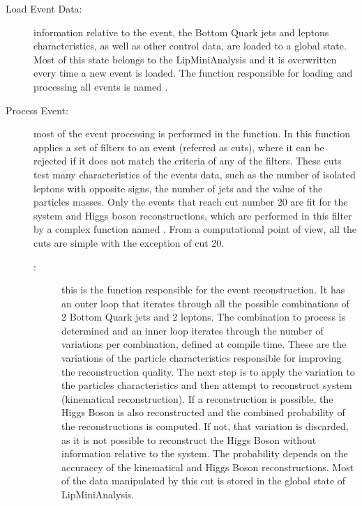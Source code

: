 \begin{description}
	\item[Load Event Data:] information relative to the event, the Bottom Quark jets and leptons characteristics, as well as other control data, are loaded to a global state. Most of this state belongs to the LipMiniAnalysis and it is overwritten every time a new event is loaded. The function responsible for loading and processing all events is named \ttLoop.
	\item[Process Event:] most of the event processing is performed in the \ttDoCuts function. In this function applies a set of filters to an event (referred as cuts), where it can be rejected if it does not match the criteria of any of the filters. These cuts test many characteristics of the events data, such as the number of isolated leptons with opposite signs, the number of jets and the value of the particles masses. Only the events that reach cut number 20 are fit for the \ttbar system and Higgs boson reconstructions, which are performed in this filter by a complex function named \ttDilepKinFit. From a computational point of view, all the cuts are simple with the exception of cut 20.
	\begin{description}
		\item[\ttDilepKinFit:] this is the function responsible for the event reconstruction. It has an outer loop that iterates through all the possible combinations of 2 Bottom Quark jets and 2 leptons. The combination to process is determined and an inner loop iterates through the number of variations per combination, defined at compile time. These are the variations of the particle characteristics responsible for improving the reconstruction quality. The next step is to apply the variation to the particles characteristics and then attempt to reconstruct \ttbar system (kinematical reconstruction). If a reconstruction is possible, the Higgs Boson is also reconstructed and the combined probability of the reconstructions is computed. If not, that variation is discarded, as it is not possible to reconstruct the Higgs Boson without information relative to the \ttbar system. The probability depends on the accuraccy of the kinematical and Higgs Boson reconstructions. Most of the data manipulated by this cut is stored in the global state of LipMiniAnalysis.
	\end{description}
\end{description}

